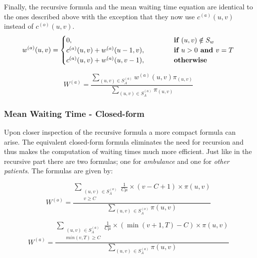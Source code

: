 Finally, the recursive formula and the mean waiting time equation are identical 
to the ones described above with the exception that they now use \(c^{(a)}(u,v)\) 
instead of \(c^{(o)}(u,v)\).
\begin{equation} \label{eq:waiting-time-at-each-state-ambulance}
    w^{(a)}(u,v) = 
    \begin{cases} 
        0, \hspace{4.85cm} & \textbf{if } (u,v) \notin S_w \\
        c^{(a)}(u,v) + w^{(a)}(u-1, v), & \textbf{if } u > 0 \textbf{ and } v = T \\
        c^{(a)}(u,v) + w^{(a)}(u, v-1), & \textbf{otherwise}
    \end{cases}
\end{equation}

\begin{equation}\label{eq:recursive-waiting-time-ambulance}
    W^{(a)} = \frac{\sum_{(u,v) \in S_A^{(a)}} w^{(a)}(u,v) \pi_{(u,v)}}
    {\sum_{(u,v) \in S_A^{(a)}} \pi_{(u,v)}}
\end{equation}

\subsubsection{Mean Waiting Time - Closed-form}
Upon closer inspection of the recursive formula a more compact formula can arise. 
The equivalent closed-form formula eliminates the need for recursion and thus makes 
the computation of waiting times much more efficient. 
Just like in the recursive part there are two formulas; one for \textit{ambulance} 
and one for \textit{other patients}. 
The formulas are given by:

\begin{equation} \label{eq:closed_form_waiting_others}
    W^{(o)} = \frac{\sum_{\substack{(u,v) \, \in S_A^{(o)} \\ v \geq C}} 
    \frac{1}{C \mu} \times (v-C+1) \times \pi(u,v)}{\sum_{(u,v) \, 
    \in S_A^{(o)}} \pi(u,v)}
\end{equation}
    
\begin{equation}\label{eq:closed_form_waiting_ambulance}
    W^{(a)} = \frac{\sum_{\substack{(u,v) \, \in S_A^{(a)} \\ min(v,T) \geq C}} 
    \frac{1}{C \mu} \times (\min(v+1,T)-C) \times \pi(u,v)}{\sum_{(u,v) \, 
    \in S_A^{(a)}} \pi(u,v)}
\end{equation}

